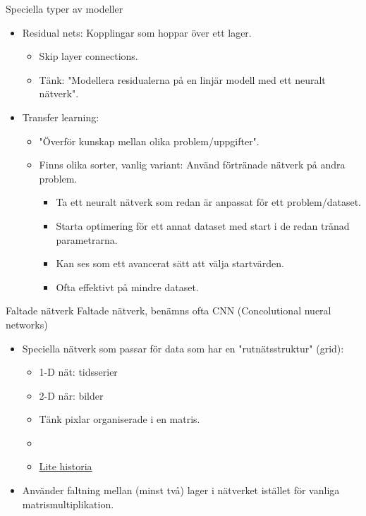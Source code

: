 \documentclass[10pt,english]{beamer}
\begin{document}
\begin{frame}{Speciella typer av modeller}
    \begin{itemize}
        \item Residual nets: Kopplingar som hoppar över ett lager.
        \begin{itemize}
            \item Skip layer connections.
            \item Tänk: "Modellera residualerna på en linjär modell med ett neuralt nätverk".
        \end{itemize}
        \item Transfer learning:
        \begin{itemize}
            \item "Överför kunskap mellan olika problem/uppgifter".
            \item Finns olika sorter, vanlig variant: Använd förtränade nätverk på andra problem.
            \begin{itemize}
                \item Ta ett neuralt nätverk som redan är anpassat för ett problem/dataset.
                \item Starta optimering för ett annat dataset med start i de redan tränad parametrarna.
                \item Kan ses som ett avancerat sätt att välja startvärden.
                \item Ofta effektivt på mindre dataset.
            \end{itemize}
        \end{itemize}
    \end{itemize}
\end{frame}

\begin{frame}{Faltade nätverk}
    Faltade nätverk, benämns ofta CNN (Concolutional nueral networks)
    \begin{itemize}
        \item Speciella nätverk som passar för data som har en "rutnätsstruktur" (grid):
        \begin{itemize}
            \item 1-D nät: tidsserier
            \item 2-D när: bilder
            \item Tänk pixlar organiserade i en matris.
            \item {}
            \item \href{https://dataconomy.com/2017/04/history-neural-networks/}{Lite historia}
        \end{itemize}
        \item Använder faltning mellan (minst två) lager i nätverket istället för vanliga matrismultiplikation.
    \end{itemize}
\end{frame}
\end{document}
